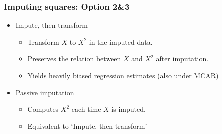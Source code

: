 \documentclass{beamer}
\begin{document}
\begin{frame}
  \frametitle{Imputing squares: Option 2\&3}
   \begin{itemize}
   \item Impute, then transform
   \begin{itemize}
   \item Transform $X$ to $X^2$ in the imputed data. 
   \item Preserves the relation between $X$ and $X^2$ after imputation. 
   \item Yields heavily biased regression estimates (also under MCAR)
   \end{itemize}
   \item Passive imputation
   \begin{itemize}
   \item Computes $X^2$ each time $X$ is imputed. 
   \item Equivalent to `Impute, then transform'   
   \end{itemize}
  \end{itemize}
    \vspace{0.2 in}
\end{frame}
\end{document}
